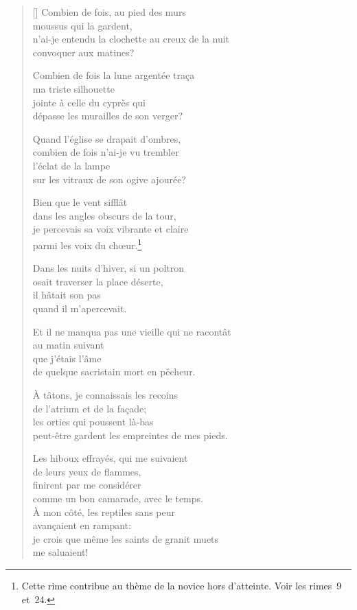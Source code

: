 \documentclass[a4paper,12pt]{book}
\begin{document}
\begin{verse}[\versewidth]
  Combien de fois, au pied des murs \\
  moussus qui la gardent, \\
  n'ai-je entendu la clochette au creux de la nuit \\
  convoquer aux matines?

  Combien de fois la lune argentée traça \\
  ma triste silhouette \\
  jointe à celle du cyprès qui \\
  dépasse les murailles de son verger?

  Quand l'église se drapait d'ombres, \\
  combien de fois n'ai-je vu trembler \\
  l'éclat de la lampe \\
  sur les vitraux de son ogive ajourée?

  Bien que le vent sifflât \\
  dans les angles obscurs de la tour, \\
  je percevais sa voix vibrante et claire \\
  parmi les voix du chœur.\footnote{Cette rime contribue au thème de
  la novice hors d'atteinte. Voir les rimes~9 et~24.}

  Dans les nuits d'hiver, si un poltron \\
  osait traverser la place déserte, \\
  il hâtait son pas \\
  quand il m'apercevait.

  Et il ne manqua pas une vieille qui ne racontât \\
  au matin suivant \\
  que j'étais l'âme \\
  de quelque sacristain mort en pécheur.

  À tâtons, je connaissais les recoins \\
  de l'atrium et de la façade; \\
  les orties qui poussent là-bas \\
  peut-être gardent les empreintes de mes pieds.

  Les hiboux effrayés, qui me suivaient \\
  de leurs yeux de flammes, \\
  finirent par me considérer \\
  comme un bon camarade, avec le temps. \\

  À mon côté, les reptiles sans peur \\
  avançaient en rampant: \\
  je crois que même les saints de granit muets \\
  me saluaient!
\end{verse}
\end{document}
